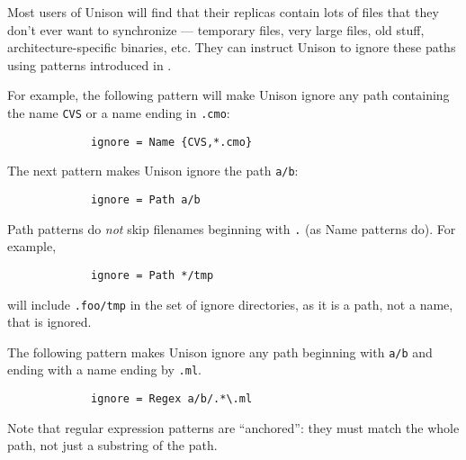 \documentclass{article}
\begin{document}

Most users of Unison will find that their replicas contain lots of
files that they don't ever want to synchronize --- temporary files,
very large files, old stuff, architecture-specific binaries, etc.
They can instruct Unison to ignore these paths using patterns
introduced in .

For example, the following pattern will make Unison ignore any
path containing the name \verb|CVS| or a name ending in \verb|.cmo|:
\begin{verbatim}
             ignore = Name {CVS,*.cmo}
\end{verbatim}
The next pattern makes Unison ignore the path \verb|a/b|:
\begin{verbatim}
             ignore = Path a/b
\end{verbatim}
Path patterns do {\em not} skip filenames beginning with \verb|.| (as Name
patterns do).  For example,
\begin{verbatim}
             ignore = Path */tmp
\end{verbatim}
will include \verb|.foo/tmp| in the set of ignore directories, as it is a
path, not a name, that is ignored.

The following pattern makes Unison ignore any path beginning with \verb|a/b|
and ending with a name ending by \verb|.ml|.
\begin{verbatim}
             ignore = Regex a/b/.*\.ml
\end{verbatim}
Note that regular expression patterns are ``anchored'': they must
match the whole path, not just a substring of the path.
\end{document}
